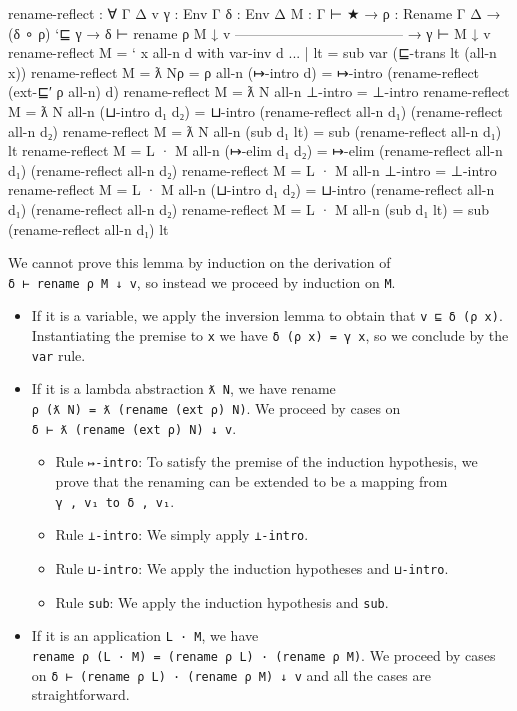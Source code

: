 \begin{fence}
\begin{code}
rename-reflect : ∀ {Γ Δ v} {γ : Env Γ} {δ : Env Δ} { M : Γ ⊢ ★}
  → {ρ : Rename Γ Δ}
  → (δ ∘ ρ) `⊑ γ
  → δ ⊢ rename ρ M ↓ v
    ------------------------------------
  → γ ⊢ M ↓ v
rename-reflect {M = ` x} all-n d with var-inv d
... | lt =  sub var (⊑-trans lt (all-n x))
rename-reflect {M = ƛ N}{ρ = ρ} all-n (↦-intro d) =
   ↦-intro (rename-reflect (ext-⊑′ ρ all-n) d)
rename-reflect {M = ƛ N} all-n ⊥-intro = ⊥-intro
rename-reflect {M = ƛ N} all-n (⊔-intro d₁ d₂) =
   ⊔-intro (rename-reflect all-n d₁) (rename-reflect all-n d₂)
rename-reflect {M = ƛ N} all-n (sub d₁ lt) =
   sub (rename-reflect all-n d₁) lt
rename-reflect {M = L · M} all-n (↦-elim d₁ d₂) =
   ↦-elim (rename-reflect all-n d₁) (rename-reflect all-n d₂)
rename-reflect {M = L · M} all-n ⊥-intro = ⊥-intro
rename-reflect {M = L · M} all-n (⊔-intro d₁ d₂) =
   ⊔-intro (rename-reflect all-n d₁) (rename-reflect all-n d₂)
rename-reflect {M = L · M} all-n (sub d₁ lt) =
   sub (rename-reflect all-n d₁) lt
\end{code}
\end{fence}

We cannot prove this lemma by induction on the derivation of
\texttt{δ\ ⊢\ rename\ ρ\ M\ ↓\ v}, so instead we proceed by induction on
\texttt{M}.

\begin{itemize}
\item
  If it is a variable, we apply the inversion lemma to obtain that
  \texttt{v\ ⊑\ δ\ (ρ\ x)}. Instantiating the premise to \texttt{x} we
  have \texttt{δ\ (ρ\ x)\ =\ γ\ x}, so we conclude by the \texttt{var}
  rule.
\item
  If it is a lambda abstraction \texttt{ƛ\ N}, we have rename
  \texttt{ρ\ (ƛ\ N)\ =\ ƛ\ (rename\ (ext\ ρ)\ N)}. We proceed by cases
  on \texttt{δ\ ⊢\ ƛ\ (rename\ (ext\ ρ)\ N)\ ↓\ v}.

  \begin{itemize}
  \item
    Rule \texttt{↦-intro}: To satisfy the premise of the induction
    hypothesis, we prove that the renaming can be extended to be a
    mapping from \texttt{γ\ ,\ v₁\ to\ δ\ ,\ v₁}.
  \item
    Rule \texttt{⊥-intro}: We simply apply \texttt{⊥-intro}.
  \item
    Rule \texttt{⊔-intro}: We apply the induction hypotheses and
    \texttt{⊔-intro}.
  \item
    Rule \texttt{sub}: We apply the induction hypothesis and
    \texttt{sub}.
  \end{itemize}
\item
  If it is an application \texttt{L\ ·\ M}, we have
  \texttt{rename\ ρ\ (L\ ·\ M)\ =\ (rename\ ρ\ L)\ ·\ (rename\ ρ\ M)}.
  We proceed by cases on
  \texttt{δ\ ⊢\ (rename\ ρ\ L)\ ·\ (rename\ ρ\ M)\ ↓\ v} and all the
  cases are straightforward.
\end{itemize}

